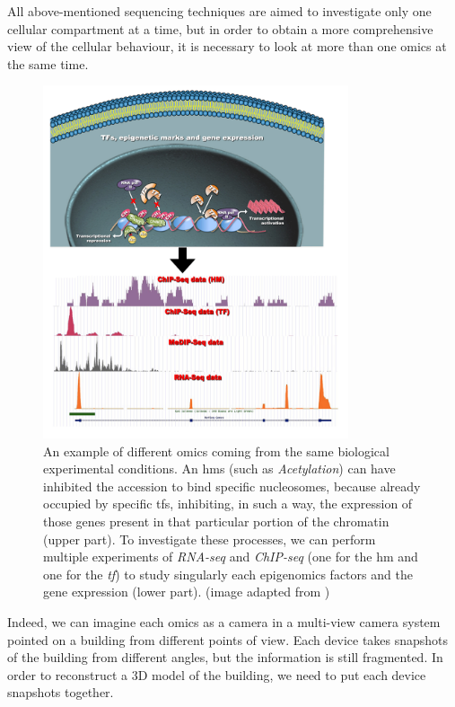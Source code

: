 All above-mentioned sequencing techniques are aimed to investigate only one cellular compartment at a time, but in order to obtain a more comprehensive view of the cellular behaviour, it is necessary to look at more than one omics at the same time.

\begin{figure}[H]
\centering
\includegraphics[width=9cm, keepaspectratio]{img/intro/multiomicsex.png}
\caption[Multi-Omics Representation]{An example of different omics coming from the same biological experimental conditions. 
An \glspl{hm} (such as \textit{Acetylation}) can have inhibited the accession to bind specific nucleosomes, because already occupied by specific \glspl{tf}, inhibiting, in such a way, the expression of those genes present in that particular portion of the chromatin (upper part).
To investigate these processes, we can perform multiple experiments of \textit{RNA-seq} and \textit{ChIP-seq} (one for the \gls{hm} and one for the \textit{tf}) to study singularly each epigenomics factors and the gene expression (lower part).
(image adapted from \cite{Angelini2014c})}
\label{fig:omics}
\end{figure}

Indeed, we can imagine each omics as a camera in a multi-view camera system pointed on a building from different points of view.
Each device takes snapshots of the building from different angles, but the information is still fragmented.
In order to reconstruct a 3D model of the building, we need to put each device snapshots together.

